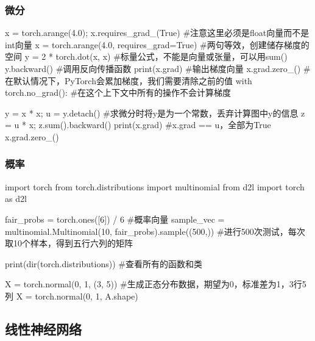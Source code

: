     \subsubsection{微分}
      \begin{codeblock}[language=python, caption={differentiation}]
        x = torch.arange(4.0); x.requires_grad_(True) #注意这里必须是float向量而不是int向量
        x = torch.arange(4.0, requires_grad=True) #两句等效，创建储存梯度的空间
        y = 2 * torch.dot(x, x) #标量公式，不能是向量或张量，可以用sum()
        y.backward() #调用反向传播函数
        print(x.grad) #输出梯度向量
        x.grad.zero_() #在默认情况下，PyTorch会累加梯度，我们需要清除之前的值
        with torch.no_grad(): #在这个上下文中所有的操作不会计算梯度

        y = x * x; u = y.detach() #求微分时将y是为一个常数，丢弃计算图中y的信息
        z = u * x; z.sum().backward()
        print(x.grad) #x.grad == u，全部为True
        x.grad.zero_()
      \end{codeblock}

    \subsubsection{概率}
      \begin{codeblock}[language=python, caption={Probability and Statistics}]
        import torch
        from torch.distributions import multinomial
        from d2l import torch as d2l
        
        fair_probs = torch.ones([6]) / 6 #概率向量
        sample_vec = multinomial.Multinomial(10, fair_probs).sample((500,)) 
            #进行500次测试，每次取10个样本，得到五行六列的矩阵

        print(dir(torch.distributions)) #查看所有的函数和类

        X = torch.normal(0, 1, (3, 5)) #生成正态分布数据，期望为0，标准差为1，3行5列
        X = torch.normal(0, 1, A.shape) 
      \end{codeblock}

  \subsection{线性神经网络}
